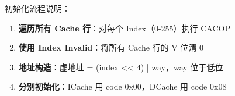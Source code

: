初始化流程说明：
\begin{enumerate}
    \item \textbf{遍历所有 Cache 行}：对每个 Index（0-255）执行 CACOP
    \item \textbf{使用 Index Invalid}：将所有 Cache 行的 V 位清 0
    \item \textbf{地址构造}：虚地址 = (index << 4) | way，way 位于低位
    \item \textbf{分别初始化}：ICache 用 code 0x00，DCache 用 code 0x08
\end{enumerate}
